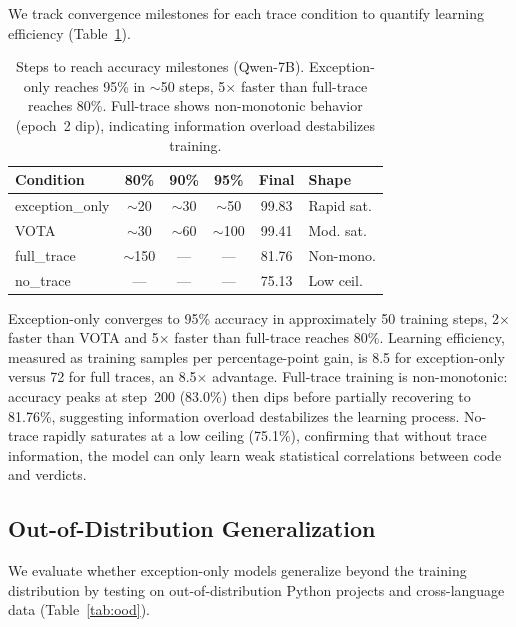 \documentclass[11pt,a4paper]{article}
\begin{document}
We track convergence milestones for each trace condition to quantify learning efficiency (Table~\ref{tab:dynamics}).

\begin{table}[t]
\centering
\small
\begin{tabular}{lccccl}
\toprule
\textbf{Condition} & \textbf{80\%} & \textbf{90\%} & \textbf{95\%} & \textbf{Final} & \textbf{Shape} \\
\midrule
exception\_only & $\sim$20 & $\sim$30 & $\sim$50 & 99.83 & Rapid sat. \\
VOTA & $\sim$30 & $\sim$60 & $\sim$100 & 99.41 & Mod. sat. \\
full\_trace & $\sim$150 & --- & --- & 81.76 & Non-mono. \\
no\_trace & --- & --- & --- & 75.13 & Low ceil. \\
\bottomrule
\end{tabular}
\caption{Steps to reach accuracy milestones (Qwen-7B). Exception-only reaches 95\% in $\sim$50 steps, 5$\times$ faster than full-trace reaches 80\%. Full-trace shows non-monotonic behavior (epoch~2 dip), indicating information overload destabilizes training.}
\label{tab:dynamics}
\end{table}

Exception-only converges to 95\% accuracy in approximately 50 training steps, 2$\times$ faster than VOTA and 5$\times$ faster than full-trace reaches 80\%. Learning efficiency, measured as training samples per percentage-point gain, is 8.5 for exception-only versus 72 for full traces, an 8.5$\times$ advantage. Full-trace training is non-monotonic: accuracy peaks at step~200 (83.0\%) then dips before partially recovering to 81.76\%, suggesting information overload destabilizes the learning process. No-trace rapidly saturates at a low ceiling (75.1\%), confirming that without trace information, the model can only learn weak statistical correlations between code and verdicts.

\subsection{Out-of-Distribution Generalization}
\label{sec:ood}

We evaluate whether exception-only models generalize beyond the training distribution by testing on out-of-distribution Python projects and cross-language data (Table~\ref{tab:ood}).
\end{document}
